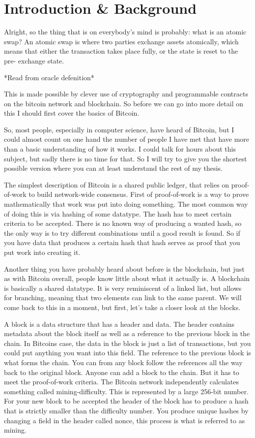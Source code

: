 \chapter{Introduction \& Background}
Alright, so the thing that is on everybody's mind is probably: what is an atomic 
swap? An atomic swap is where two parties exchange assets atomically, which means
that either the transaction takes place fully, or the state is reset to the pre-
exchange state. 

*Read from oracle defenition*

This is made possible by clever use of cryptography and 
programmable contracts on the bitcoin network and blockchain. So before we can 
go into more detail on this I should first cover the basics of Bitcoin.

So, most people, especially in computer science, have heard of Bitcoin, but I could 
almost count on one hand the number of people I have met that have more than 
a basic understanding of how it works. I could talk for hours about this 
subject, but sadly there is no time for that. So I will try to give you the 
shortest possible version where you can at least understand the rest of my
thesis.

The simplest description of Bitcoin is a shared public ledger, that relies 
on proof-of-work to build network-wide consensus. First of proof-of-work
is a way to prove mathematically that work was put into doing something. 
The most common way of doing this is via hashing of some datatype.
The hash has to meet certain criteria to be accepted. There is no known 
way of producing a wanted hash, so the only way is to try different combinations
until a good result is found. So if you have data that produces a certain hash
that hash serves as proof that you put work into creating it.

Another thing you have probably heard about before is the blockchain, but
just as with Bitcoin overall, people know little about what it actually is. 
A blockchain is basically a shared datatype. It is very reminiscent of a
linked list, but allows for branching, meaning that two elements can link 
to the same parent. We will come back to this in a moment, but first, let's 
take a closer look at the blocks.

A block is a data structure that has a header and data. The header contains 
metadata about the block itself as well as a reference to the previous block
in the chain. In Bitcoins case, the data in the block is just a list of transactions,
but you could put anything you want into this field. The reference to the previous
block is what forms the chain. You can from any block follow the references 
all the way back to the original block. Anyone can add a block to the chain. But 
it has to meet the proof-of-work criteria. The Bitcoin network independently calculates 
something called mining-difficulty. This is represented by a large 256-bit number. 
For your new block to be accepted the header of the block has to produce a hash that
is strictly smaller than the difficulty number. You produce unique hashes by changing 
a field in the header called nonce, this process is what is referred to as mining. 

